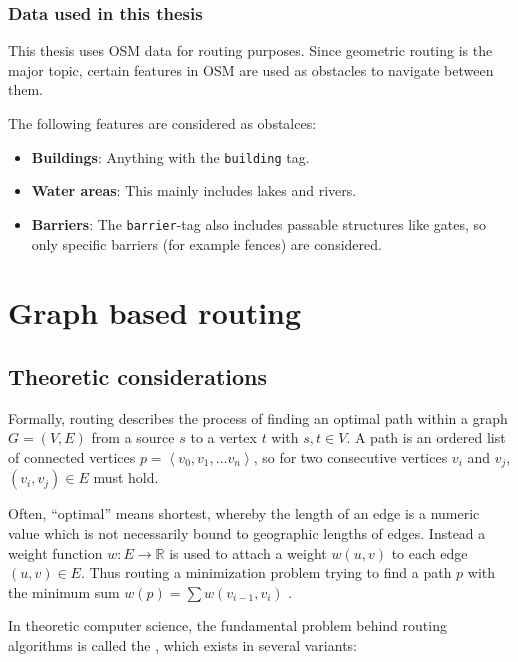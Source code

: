 		\subsubsection{Data used in this thesis}
		
			This thesis uses OSM data for routing purposes.
			Since geometric routing is the major topic, certain features in OSM are used as obstacles to navigate between them.
			
			The following features are considered as obstalces:
			\begin{itemize}
				\item \textbf{Buildings}: Anything with the \texttt{building} tag.
				\item \textbf{Water areas}: This mainly includes lakes and rivers.
				\item \textbf{Barriers}: The \texttt{barrier}-tag also includes passable structures like gates, so only specific barriers (for example fences) are considered.
			\end{itemize}

\section{Graph based routing}
\label{sec:graph-routing}

	\subsection{Theoretic considerations}
	\label{subsec:routing-theoretic-considerations}	
	
		Formally, routing describes the process of finding an optimal path within a graph $G=(V, E)$ from a source $s$ to a vertex $t$ with $s, t \in V$.
		A path is an ordered list of connected vertices $p=\left\langle v_0, v_1, \dots v_n \right\rangle$, so for two consecutive vertices $v_i$ and $v_j$, $(v_i, v_j) \in E$ must hold.
		
		Often, \enquote{optimal} means shortest, whereby the length of an edge is a numeric value which is not necessarily bound to geographic lengths of edges.
		Instead a weight function $w : E \rightarrow \mathbb{R}$ is used to attach a weight $w(u, v)$ to each edge $(u, v) \in E$.
		Thus routing a minimization problem trying to find a path $p$ with the minimum sum $w(p) = \sum{w(v_{i-1}, v_i)}$ \cite[645]{cormen-introduction-to-alg}.
		
		In theoretic computer science, the fundamental problem behind routing algorithms is called the , which exists in several variants\cite[644]{cormen-introduction-to-alg}:
		
